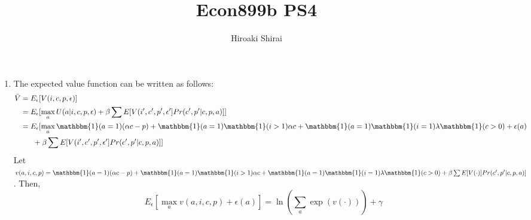 \documentclass{article}
\title{Econ899b PS4}
\author{Hiroaki Shirai}
\begin{document}
\maketitle

\begin{enumerate}
\item The expected value function can be written as follows:
  \begin{equation*}
    \begin{split}
      \bar{V} &= E_{\epsilon}[V(i,c,p,\epsilon)] \\
      &= E_{\epsilon}[\max_{a} U(a|i,c,p,\epsilon) + \beta \sum E[V(i',c',p',\epsilon']Pr(c',p'|c,p,a)]] \\
      &= E_{\epsilon}[\max_{a} \mathbbm{1}(a =1)(\alpha c - p) + \mathbbm{1}(a =1)\mathbbm{1}(i > 1)\alpha c + \mathbbm{1}(a =1)\mathbbm{1}(i = 1)\lambda\mathbbm{1}(c>0)+ \epsilon(a)\\
      & \ \ \ \ \ + \beta \sum E[V(i',c',p',\epsilon']Pr(c',p'|c,p,a)]] \\
    \end{split}
  \end{equation*}
  Let $v(a, i, c, p) = \mathbbm{1}(a =1)(\alpha c - p) + \mathbbm{1}(a =1)\mathbbm{1}(i > 1)\alpha c + \mathbbm{1}(a =1)\mathbbm{1}(i = 1)\lambda\mathbbm{1}(c>0)+ \beta \sum E[V(\cdot)]Pr(c',p'|c,p,a)]$. Then,
  \begin{equation*}
    E_{\epsilon}[\max_a v(a, i, c, p) + \epsilon(a)] = \ln(\sum_a \exp(v(\cdot))) + \gamma
  \end{equation*}


\end{enumerate}
\end{document}
